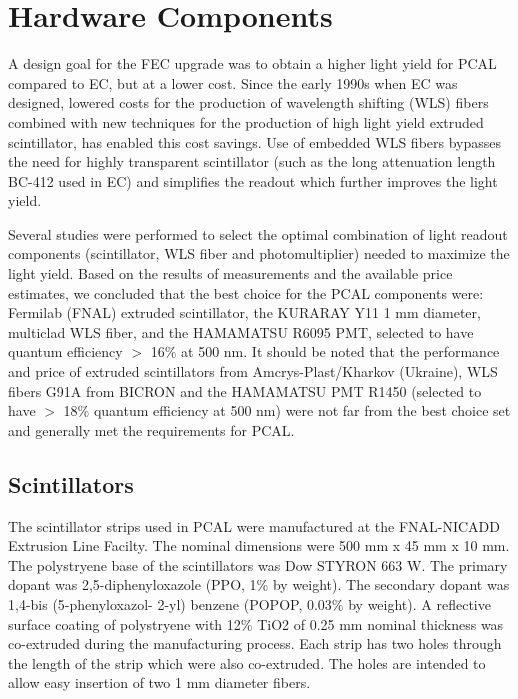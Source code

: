 \section{Hardware Components}

A design goal for the FEC upgrade was to obtain a higher light yield for PCAL compared to EC, but at a lower cost.  Since the early 1990s when EC was designed, lowered costs for the production of wavelength shifting (WLS) fibers combined with new techniques for the production of high light yield extruded scintillator, has enabled this cost savings.  Use of embedded WLS fibers bypasses the need for highly transparent scintillator (such as the long attenuation length BC-412 used in EC) and simplifies the readout which further improves the light yield.

Several studies were performed \cite{2007002,2007007,2009018} to select the optimal combination of light readout components (scintillator, WLS fiber and photomultiplier) needed to maximize the light yield.  Based on the results of measurements and the available price estimates, we concluded that the best choice for the PCAL components were: Fermilab (FNAL) extruded scintillator, the KURARAY Y11 1 mm diameter, multiclad WLS fiber, and the HAMAMATSU R6095 PMT, selected to have quantum efficiency $>$ 16$\%$ at 500 nm. It should be noted that the performance and price of extruded scintillators from Amcrys-Plast/Kharkov (Ukraine), WLS fibers G91A from BICRON and the HAMAMATSU PMT R1450 (selected to have $>$ 18$\%$ quantum efficiency at 500 nm) were not far from the best choice set and generally met the requirements for PCAL.    

\subsection{Scintillators}

The scintillator strips used in PCAL were manufactured at the FNAL-NICADD Extrusion Line Facilty.  The nominal dimensions were 500 mm x 45 mm x 10 mm. The polystryene base of the scintillators was Dow STYRON 663 W. The primary dopant was 2,5-diphenyloxazole (PPO, 1$\%$ by weight). The secondary dopant was 1,4-bis (5-phenyloxazol- 2-yl) benzene (POPOP, 0.03$\%$ by weight).  A reflective surface coating of polystryene with 12$\%$ TiO2 of 0.25 mm nominal thickness was co-extruded during the manufacturing process.  Each strip has two holes through the length of the strip which were also co-extruded. The holes are intended to allow easy insertion of two 1 mm diameter fibers.

